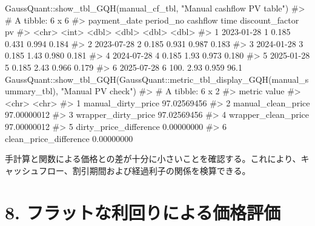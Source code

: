 \documentclass[
  letterpaper,
  DIV=11,
  numbers=noendperiod]{scrreprt}
\newenvironment{Shaded}{\begin{snugshade}}{\end{snugshade}}
\newcommand{\CommentTok}[1]{\textcolor[rgb]{0.37,0.37,0.37}{#1}}
\newcommand{\FunctionTok}[1]{\textcolor[rgb]{0.28,0.35,0.67}{#1}}
\newcommand{\NormalTok}[1]{\textcolor[rgb]{0.00,0.23,0.31}{#1}}
\newcommand{\SpecialCharTok}[1]{\textcolor[rgb]{0.37,0.37,0.37}{#1}}
\newcommand{\StringTok}[1]{\textcolor[rgb]{0.13,0.47,0.30}{#1}}
\begin{document}
\begin{Shaded}
\begin{Highlighting}[]
\NormalTok{GaussQuant}\SpecialCharTok{::}\FunctionTok{show\_tbl\_GQH}\NormalTok{(manual\_cf\_tbl, }\StringTok{"Manual cashflow PV table"}\NormalTok{)}
\CommentTok{\#\textgreater{} \# A tibble: 6 x 6}
\CommentTok{\#\textgreater{}   payment\_date period\_no cashflow  time discount\_factor     pv}
\CommentTok{\#\textgreater{}   \textless{}chr\textgreater{}            \textless{}int\textgreater{}    \textless{}dbl\textgreater{} \textless{}dbl\textgreater{}           \textless{}dbl\textgreater{}  \textless{}dbl\textgreater{}}
\CommentTok{\#\textgreater{} 1 2023{-}01{-}28           1    0.185 0.431           0.994  0.184}
\CommentTok{\#\textgreater{} 2 2023{-}07{-}28           2    0.185 0.931           0.987  0.183}
\CommentTok{\#\textgreater{} 3 2024{-}01{-}28           3    0.185 1.43            0.980  0.181}
\CommentTok{\#\textgreater{} 4 2024{-}07{-}28           4    0.185 1.93            0.973  0.180}
\CommentTok{\#\textgreater{} 5 2025{-}01{-}28           5    0.185 2.43            0.966  0.179}
\CommentTok{\#\textgreater{} 6 2025{-}07{-}28           6  100.    2.93            0.959 96.1}
\NormalTok{GaussQuant}\SpecialCharTok{::}\FunctionTok{show\_tbl\_GQH}\NormalTok{(GaussQuant}\SpecialCharTok{::}\FunctionTok{metric\_tbl\_display\_GQH}\NormalTok{(manual\_summary\_tbl), }\StringTok{"Manual PV check"}\NormalTok{)}
\CommentTok{\#\textgreater{} \# A tibble: 6 x 2}
\CommentTok{\#\textgreater{}   metric                 value      }
\CommentTok{\#\textgreater{}   \textless{}chr\textgreater{}                  \textless{}chr\textgreater{}      }
\CommentTok{\#\textgreater{} 1 manual\_dirty\_price     97.02569456}
\CommentTok{\#\textgreater{} 2 manual\_clean\_price     97.00000012}
\CommentTok{\#\textgreater{} 3 wrapper\_dirty\_price    97.02569456}
\CommentTok{\#\textgreater{} 4 wrapper\_clean\_price    97.00000012}
\CommentTok{\#\textgreater{} 5 dirty\_price\_difference 0.00000000 }
\CommentTok{\#\textgreater{} 6 clean\_price\_difference 0.00000000}
\end{Highlighting}
\end{Shaded}

手計算と関数による価格との差が十分に小さいことを確認する。これにより、キャッシュフロー、割引期間および経過利子の関係を検算できる。

\section{8.
フラットな利回りによる価格評価}\label{ux30d5ux30e9ux30c3ux30c8ux306aux5229ux56deux308aux306bux3088ux308bux4fa1ux683cux8a55ux4fa1}
\end{document}
